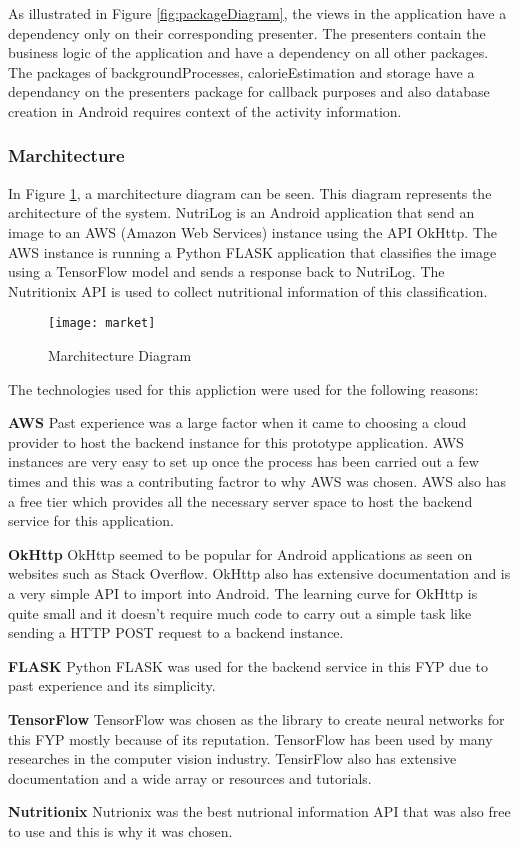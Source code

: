As illustrated in Figure \ref{fig:packageDiagram}, the views in the application
have a dependency only on their corresponding presenter.
The presenters contain the business logic of the  application and have a dependency on all other packages.
The packages of backgroundProcesses, calorieEstimation and storage have a dependancy on the presenters package for callback purposes and also database creation in Android requires context of the activity information.

\tocless\subsubsection{Marchitecture}
In Figure \ref{fig:market}, a marchitecture diagram can be seen.
This diagram represents the architecture of the system.
NutriLog is an Android application that send an image to an AWS (Amazon Web Services) instance using the API OkHttp. The AWS instance is running a Python FLASK application that classifies the image using a TensorFlow model and sends a response back to NutriLog. The Nutritionix API is used to collect nutritional information of this classification.

\begin{figure}[h]
    \centering
    \texttt{[image: market]}
    \caption{Marchitecture Diagram}
    \label{fig:market}
\end{figure}

The technologies used for this appliction were used for the following reasons:

\textbf{AWS}
\linebreak
Past experience was a large factor when it came to choosing a cloud provider to host the backend instance for this prototype application.
AWS instances are very easy to set up once the process has been carried out a few times and this was a contributing factror to why AWS was chosen.
AWS also has a free tier which provides all the necessary server space to host the backend service for this application.

\textbf{OkHttp}
\linebreak
OkHttp seemed to be popular for Android applications as seen on websites such as Stack Overflow.
OkHttp also has extensive documentation and is a very simple API to import into Android.
The learning curve for OkHttp is quite small and it doesn't require much code to carry out a simple task like sending a HTTP POST request to a backend instance.

\textbf{FLASK}
\linebreak
Python FLASK was used for the backend service in this FYP due to past experience and its simplicity.

\textbf{TensorFlow}
\linebreak
TensorFlow was chosen as the library to create neural networks for this FYP mostly because of its reputation.
TensorFlow has been used by many researches in the computer vision industry.
TensirFlow also has extensive documentation and a wide array or resources and tutorials.

\textbf{Nutritionix}
\linebreak
Nutrionix was the best nutrional information API that was also free to use and this is why it was chosen.